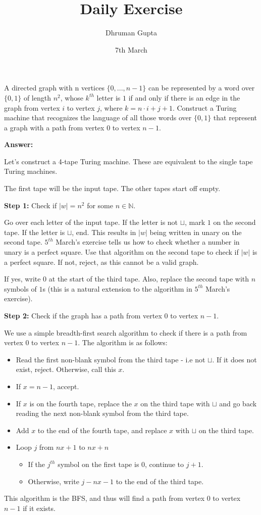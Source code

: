 \documentclass[11pt]{article}
\title{Daily Exercise}
\author{Dhruman Gupta}
\date{7th March}
\begin{document}

A directed graph with n vertices $\{0, . . . , n - 1\}$ can be represented by a word over $\{0, 1\}$ of length $n^2$, whose $k^{th}$ letter is $1$ if and only if there is an edge in the graph from vertex $i$ to vertex $j$, where $k = n · i + j + 1$. Construct a Turing machine that recognizes the language of all those words over $\{0, 1\}$ that represent a graph with a path from vertex $0$ to vertex $n - 1$.

\textbf{Answer:}

Let's construct a 4-tape Turing machine. These are equivalent to the single tape Turing machines.

The first tape will be the input tape. The other tapes start off empty.

\textbf{Step 1:} Check if $|w| = n^2$ for some $n \in \mathbb{N}$.

Go over each letter of the input tape. If the letter is not $\sqcup$, mark $1$ on the second tape. If the letter is $\sqcup$, end. This results in $|w|$ being written in unary on the second tape. $5^{th}$ March's exercise tells us how to check whether a number in unary is a perfect square. Use that algorithm on the second tape to check if $|w|$ is a perfect square. If not, reject, as this cannot be a valid graph.

If yes, write $0$ at the start of the third tape. Also, replace the second tape with $n$ symbols of $1$s (this is a natural extension to the algorithm in $5^{th}$ March's exercise).

\textbf{Step 2:} Check if the graph has a path from vertex $0$ to vertex $n - 1$.

We use a simple breadth-first search algorithm to check if there is a path from vertex $0$ to vertex $n - 1$. The algorithm is as follows:
\begin{itemize}
    \item Read the first non-blank symbol from the third tape - i.e not $\sqcup$. If it does not exist, reject. Otherwise, call this $x$.
    \item If $x = n-1$, accept.
    \item If $x$ is on the fourth tape, replace the $x$ on the third tape with $\sqcup$ and go back reading the next non-blank symbol from the third tape.
    \item Add $x$ to the end of the fourth tape, and replace $x$ with $\sqcup$ on the third tape.
    \item Loop $j$ from $nx+1$ to $nx + n$
    \begin{itemize}
        \item If the $j^{th}$ symbol on the first tape is $0$, continue to $j+1$.
        \item Otherwise, write $j - nx - 1$ to the end of the third tape. 
    \end{itemize}
\end{itemize}

This algorithm is the BFS, and thus will find a path from vertex $0$ to vertex $n - 1$ if it exists.
\end{document}
